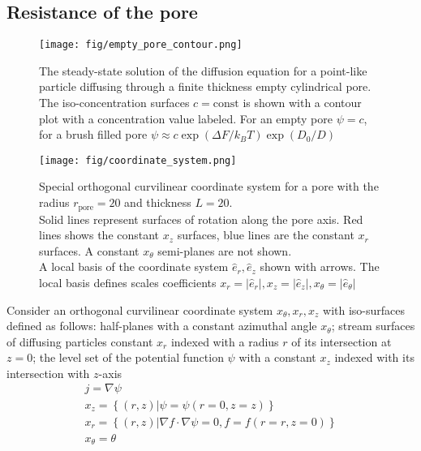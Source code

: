 \documentclass[10pt, a4paper]{article}
\begin{document}
\pagebreak 

\subsection*{Resistance of the pore}

\begin{multicols}{2}

\begin{figure}[H]
    \centering
    \texttt{[image: fig/empty\_pore\_contour.png]}
    \caption{
        The steady-state solution of the diffusion equation for a point-like particle diffusing through a finite thickness empty cylindrical pore.
        The iso-concentration surfaces $c = \textrm{const}$ is shown with a contour plot with a concentration value labeled.
        For an empty pore $\psi = c$, for a brush filled pore $\psi \approx c\exp(\Delta F / k_B T)\exp(D_0/D)$
        }
    \label{fig:empty_pore_solution}
\end{figure}
\begin{figure}[H]
    \centering
    \texttt{[image: fig/coordinate\_system.png]}
    \caption{
        Special orthogonal curvilinear coordinate system for a pore with the radius $r_{\textrm{pore}} = 20$ and thickness $L=20$.
        \\
        Solid lines represent surfaces of rotation along the pore axis.
        Red lines shows the constant $x_{z}$ surfaces, blue lines are the constant $x_{r}$ surfaces.
        A constant $x_{\theta}$ semi-planes are not shown.
        \\
        A local basis of the coordinate system $\hat{e}_r, \hat{e}_z$ shown with arrows.
        The local basis defines scales coefficients $x_r = |\hat{e}_r|, x_z = |\hat{e}_z|, x_{\theta} = |\hat{e}_{\theta}|$
        }
    \label{fig:coordinate_system}
\end{figure}

Consider an orthogonal curvilinear coordinate system $x_{\theta}, x_{r}, x_{z}$ with iso-surfaces defined as follows:
half-planes with a constant azimuthal angle $x_{\theta}$;
stream surfaces of diffusing particles constant $x_{r}$ indexed with a radius $r$ of its intersection at $z=0$;
the level set of the potential function $\psi$ with a constant $x_{z}$ indexed with its intersection with $z$-axis
\begin{gather}
    j = \nabla \psi
    \\
    x_z = \left\{(r, z) | \psi = \psi(r=0, z=z)\right\}
    \\
    x_r = \left\{(r, z) | \nabla f \cdot \nabla \psi = 0, f = f(r=r, z=0) \right\}
    \\
    x_{\theta} = \theta
\end{gather}


\end{multicols}
\end{document}
